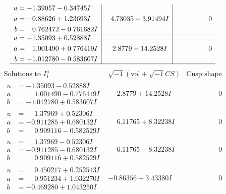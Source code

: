 \documentclass[1p]{elsarticle_modified}
\theoremstyle{definition}
\newcommand{\I}{\sqrt{-1}}
\begin{document}
$$\begin{array}{c|c|c}
\begin{aligned}
u &= -1.39057 - 0.34745 I \\
a &= -0.88626 + 1.23693 I \\
b &= \phantom{-}0.762472 - 0.761682 I\end{aligned}
 & \phantom{-}4.73035 + 3.91494 I & \phantom{-0.000000 } 0 \\ \hline\begin{aligned}
u &= -1.35093 + 0.52888 I \\
a &= \phantom{-}1.001490 + 0.776419 I \\
b &= -1.012780 - 0.583607 I\end{aligned}
 & \phantom{-}2.8779 - 14.2528 I & \phantom{-0.000000 } 0\\
 \hline 
 \end{array}$$\newpage$$\begin{array}{c|c|c}  
\text{Solutions to }I^u_{1}& \I (\text{vol} + \sqrt{-1}CS) & \text{Cusp shape}\\
 \hline 
\begin{aligned}
u &= -1.35093 - 0.52888 I \\
a &= \phantom{-}1.001490 - 0.776419 I \\
b &= -1.012780 + 0.583607 I\end{aligned}
 & \phantom{-}2.8779 + 14.2528 I & \phantom{-0.000000 } 0 \\ \hline\begin{aligned}
u &= \phantom{-}1.37969 + 0.52306 I \\
a &= -0.911285 + 0.680132 I \\
b &= \phantom{-}0.909116 - 0.582529 I\end{aligned}
 & \phantom{-}6.11765 + 8.32238 I & \phantom{-0.000000 } 0 \\ \hline\begin{aligned}
u &= \phantom{-}1.37969 - 0.52306 I \\
a &= -0.911285 - 0.680132 I \\
b &= \phantom{-}0.909116 + 0.582529 I\end{aligned}
 & \phantom{-}6.11765 - 8.32238 I & \phantom{-0.000000 } 0 \\ \hline\begin{aligned}
u &= \phantom{-}0.450217 + 0.252513 I \\
a &= \phantom{-}0.951234 + 1.032270 I \\
b &= -0.469280 + 1.043250 I\end{aligned}
 & -0.86356 - 3.43380 I & \phantom{-0.000000 } 0 \\ \hline\begin{aligned}

\end{aligned}
\end{array}$$
\end{document}
